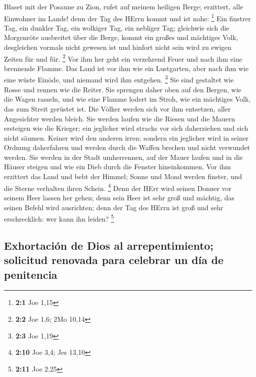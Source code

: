  Blaset mit der Posaune zu Zion, rufet auf meinem heiligen
Berge; erzittert, alle Einwohner im Lande! denn der Tag des HErrn kommt
und ist nahe: \footnote{\textbf{2:1} Joe 1,15}  Ein
finstrer Tag, ein dunkler Tag, ein wolkiger Tag, ein nebliger Tag;
gleichwie sich die Morgenröte ausbreitet über die Berge, kommt ein
großes und mächtiges Volk, desgleichen vormals nicht gewesen ist und
hinfort nicht sein wird zu ewigen Zeiten für und für. \footnote{\textbf{2:2}
  Joe 1,6; 2Mo 10,14}  Vor ihm her geht ein verzehrend
Feuer und nach ihm eine brennende Flamme. Das Land ist vor ihm wie ein
Lustgarten, aber nach ihm wie eine wüste Einöde, und niemand wird ihm
entgehen. \footnote{\textbf{2:3} Joe 1,19}  Sie sind
gestaltet wie Rosse und rennen wie die Reiter.  Sie
sprengen daher oben auf den Bergen, wie die Wagen rasseln, und wie eine
Flamme lodert im Stroh, wie ein mächtiges Volk, das zum Streit gerüstet
ist.  Die Völker werden sich vor ihm entsetzen, aller
Angesichter werden bleich.  Sie werden laufen wie die
Riesen und die Mauern ersteigen wie die Krieger; ein jeglicher wird
stracks vor sich daherziehen und sich nicht säumen. 
Keiner wird den anderen irren; sondern ein jeglicher wird in seiner
Ordnung daherfahren und werden durch die Waffen brechen und nicht
verwundet werden.  Sie werden in der Stadt umherrennen,
auf der Mauer laufen und in die Häuser steigen und wie ein Dieb durch
die Fenster hineinkommen.  Vor ihm erzittert das Land und
bebt der Himmel; Sonne und Mond werden finster, und die Sterne verhalten
ihren Schein. \footnote{\textbf{2:10} Joe 3,4; Jes 13,10}
 Denn der HErr wird seinen Donner vor seinem Heer lassen
her gehen; denn sein Heer ist sehr groß und mächtig, das seinen Befehl
wird ausrichten; denn der Tag des HErrn ist groß und sehr erschrecklich:
wer kann ihn leiden? \footnote{\textbf{2:11} Joe 2,25}

\hypertarget{exhortaciuxf3n-de-dios-al-arrepentimiento-solicitud-renovada-para-celebrar-un-duxeda-de-penitencia}{%
\subsection{Exhortación de Dios al arrepentimiento; solicitud renovada
para celebrar un día de
penitencia}\label{exhortaciuxf3n-de-dios-al-arrepentimiento-solicitud-renovada-para-celebrar-un-duxeda-de-penitencia}}

